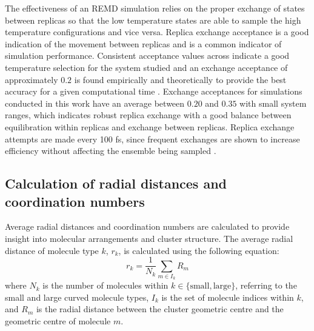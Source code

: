 The effectiveness of an REMD simulation relies on the proper exchange of states between replicas so that the low temperature states are able to sample the high temperature configurations and vice versa. Replica exchange acceptance is a good indication of the movement between replicas and is a common indicator of simulation performance. Consistent acceptance values across indicate a good temperature selection for the system studied and an exchange acceptance of approximately $0.2$ is found empirically and theoretically to provide the best accuracy for a given computational time \cite{Rathore2005,Kone}. Exchange acceptances for simulations conducted in this work have an average between $0.20$ and $0.35$ with small system ranges, which indicates robust replica exchange with a good balance between equilibration within replicas and exchange between replicas. Replica exchange attempts are made every 100 fs, since frequent exchanges are shown to increase efficiency without affecting the ensemble being sampled \cite{sindhikara2008exchange,sindhikara2010exchange}.

\subsection{Calculation of radial distances and coordination numbers}
\label{secSI:raddist_CN_eqns}
%
Average radial distances and coordination numbers are calculated to provide insight into molecular arrangements and cluster structure. The average radial distance of molecule type $k$, $r_{k}$, is calculated using the following equation:
\begin{equation}
    r_{k} = \frac{1}{N_{k}}\sum_{m \in I_{k}}R_{m}
\end{equation}
where $N_{k}$ is the number of molecules within $k \in \{\text{small},\text{large}\}$, referring to the small and large curved molecule types, $I_{k}$ is the set of molecule indices within $k$, and $R_{m}$ is the radial distance between the cluster geometric centre and the geometric centre of molecule $m$.

